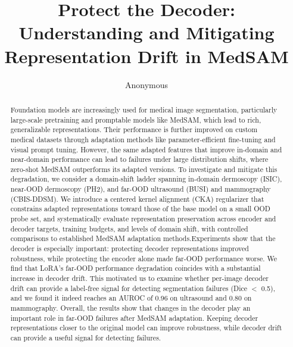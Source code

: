 \documentclass[runningheads]{llncs}
\begin{document}
\title{Protect the Decoder: Understanding and Mitigating Representation Drift in MedSAM}
\author{Anonymous}

\maketitle

\begin{abstract}
Foundation models are increasingly used for medical image segmentation, particularly large-scale pretraining and promptable models like MedSAM, which lead to rich, generalizable representations. Their performance is further improved on custom medical datasets through adaptation methods like parameter-efficient fine-tuning and visual prompt tuning. However, the same adapted features that improve in-domain and near-domain performance can lead to failures under large distribution shifts, where zero-shot MedSAM outperforms its adapted versions. To investigate and mitigate this degradation, we consider a domain-shift ladder spanning in-domain dermoscopy (ISIC), near-OOD dermoscopy (PH2), and far-OOD ultrasound (BUSI) and mammography (CBIS-DDSM). We introduce a centered kernel alignment (CKA) regularizer that constrains adapted representations toward those of the base model on a small OOD probe set, and systematically evaluate representation preservation across encoder and decoder targets, training budgets, and levels of domain shift, with controlled comparisons to established MedSAM adaptation methods.Experiments show that the decoder is especially important: protecting decoder representations improved robustness, while protecting the encoder alone made far-OOD performance worse. We find that LoRA's far-OOD performance degradation coincides with a substantial increase in decoder drift. This motivated us to examine whether per-image decoder drift can provide a label-free signal for detecting segmentation failures (Dice $<$ 0.5), and we found it indeed reaches an AUROC of 0.96 on ultrasound and 0.80 on mammography. Overall, the results show that changes in the decoder play an important role in far-OOD failures after MedSAM adaptation. Keeping decoder representations closer to the original model can improve robustness, while decoder drift can provide a useful signal for detecting failures.
\end{abstract}
\end{document}
